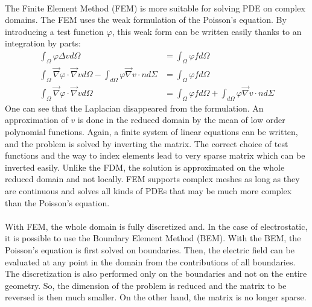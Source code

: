 \begin{refsection}
	\paragraph{}
	The Finite Element Method (FEM) is more suitable for solving PDE on complex domains. The FEM uses the weak formulation of the Poisson’s equation. By introducing a test function $\varphi$, this weak form can be written easily thanks to an integration by parts:
	\begin{align}
		\int_{\Omega}^{} \varphi \Delta v d\Omega                                                                                     & = \int_{\Omega}^{} \varphi f d\Omega                                                            \\
		\int_{\Omega}^{} \vec{\nabla} \varphi \cdot \vec{\nabla} v d\Omega - \int_{d\Omega}^{} \varphi \vec{\nabla} v \cdot n d\Sigma & = \int_{\Omega}^{} \varphi f d\Omega                                                            \\
		\int_{\Omega}^{} \vec{\nabla} \varphi \cdot \vec{\nabla} v d\Omega                                                            & = \int_{\Omega}^{} \varphi f d\Omega + \int_{d\Omega}^{} \varphi \vec{\nabla} v \cdot n d\Sigma
	\end{align}
	One can see that the Laplacian disappeared from the formulation. An approximation of $v$ is done in the reduced domain by the mean of low order polynomial functions. Again, a finite system of linear equations can be written, and the problem is solved by inverting the matrix. The correct choice of test functions and the way to index elements lead to very sparse matrix which can be inverted easily. Unlike the FDM, the solution is approximated on the whole reduced domain and not locally. FEM supports complex meshes as long as they are continuous and solves all kinds of PDEs that may be much more complex than the Poisson’s equation.

	\paragraph{}
	With FEM, the whole domain is fully discretized and. In the case of electrostatic, it is possible to use the Boundary Element Method (BEM). With the BEM, the Poisson’s equation is first solved on boundaries. Then, the electric field can be evaluated at any point in the domain from the contributions of all boundaries. The discretization is also performed only on the boundaries and not on the entire geometry. So, the dimension of the problem is reduced and the matrix to be reversed is then much smaller. On the other hand, the matrix is ​​no longer sparse.


\end{refsection}
